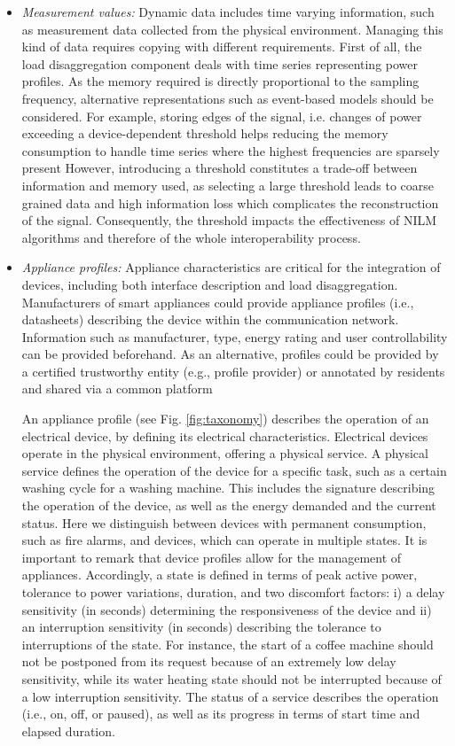 \documentclass{article}
\begin{document}
\begin{itemize}
  \item \textit{Measurement values:}
  Dynamic data includes time varying information, such as measurement data collected from the physical environment.
  Managing this kind of data requires copying with different requirements.
  First of all, the load disaggregation component deals with time series representing power profiles.
  As the memory required is directly proportional to the sampling frequency, alternative representations such as event-based models should be considered.
  For example, storing edges of the signal, i.e. changes of power exceeding a device-dependent threshold helps reducing the memory consumption to handle time series where the highest frequencies are sparsely present
  However, introducing a threshold constitutes a trade-off between information and memory used, as selecting a large threshold leads to coarse grained data and high information loss which complicates the reconstruction of the signal.
  Consequently, the threshold impacts the effectiveness of \ac{NILM} algorithms and therefore of the whole interoperability process. 
  \item \textit{Appliance profiles:}
  Appliance characteristics are critical for the integration of devices, including both interface description and load disaggregation.
  Manufacturers of smart appliances could provide appliance profiles (i.e., datasheets) describing the device within the communication network.
  Information such as manufacturer, type, energy rating and user controllability can be provided beforehand.
  As an alternative, profiles could be provided by a certified trustworthy entity (e.g., profile provider) or annotated by residents and shared via a common platform

  An appliance profile (see Fig. \ref{fig:taxonomy}) describes the operation of an electrical device, by defining its electrical characteristics.
  Electrical devices operate in the physical environment, offering a physical service.
  A physical service defines the operation of the device for a specific task, such as a certain washing cycle for a washing machine.
  This includes the signature describing the operation of the device, as well as the energy demanded and the current status.
  Here we distinguish between devices with permanent consumption, such as fire alarms, and devices, which can operate in multiple states.
  It is important to remark that device profiles allow for the management of appliances.
  Accordingly, a state is defined in terms of peak active power, tolerance to power variations, duration, and two discomfort factors: i) a delay sensitivity (in seconds) determining the responsiveness of the device and ii) an interruption sensitivity (in seconds) describing the tolerance to interruptions of the state.
  For instance, the start of a coffee machine should not be postponed from its request because of an extremely low delay sensitivity, while its water heating state should not be interrupted because of a low interruption sensitivity.
  The status of a service describes the operation (i.e., on, off, or paused), as well as its progress in terms of start time and elapsed duration.


\end{itemize}
\end{document}
